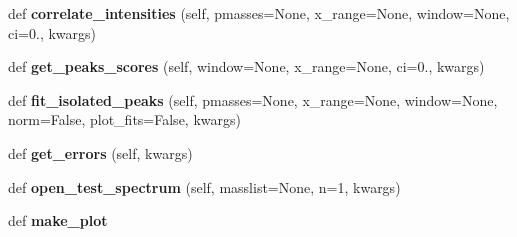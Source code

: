 \begin{DoxyCompactItemize}
\item 
\hypertarget{class_uni_dec_1_1unidec_1_1_uni_dec_a2db533d7a383e2bd7a8d031a2865cc4a}{}def {\bfseries correlate\+\_\+intensities} (self, pmasses=None, x\+\_\+range=None, window=None, ci=0., kwargs)\label{class_uni_dec_1_1unidec_1_1_uni_dec_a2db533d7a383e2bd7a8d031a2865cc4a}

\item 
\hypertarget{class_uni_dec_1_1unidec_1_1_uni_dec_af1f98ae0b18ea9be2fbec16be86ce940}{}def {\bfseries get\+\_\+peaks\+\_\+scores} (self, window=None, x\+\_\+range=None, ci=0., kwargs)\label{class_uni_dec_1_1unidec_1_1_uni_dec_af1f98ae0b18ea9be2fbec16be86ce940}

\item 
\hypertarget{class_uni_dec_1_1unidec_1_1_uni_dec_a99520cdc15ff2620cbf0f85e6c1c2a5c}{}def {\bfseries fit\+\_\+isolated\+\_\+peaks} (self, pmasses=None, x\+\_\+range=None, window=None, norm=False, plot\+\_\+fits=False, kwargs)\label{class_uni_dec_1_1unidec_1_1_uni_dec_a99520cdc15ff2620cbf0f85e6c1c2a5c}

\item 
\hypertarget{class_uni_dec_1_1unidec_1_1_uni_dec_a4cd16745c635c9617d5daeac315e2ba9}{}def {\bfseries get\+\_\+errors} (self, kwargs)\label{class_uni_dec_1_1unidec_1_1_uni_dec_a4cd16745c635c9617d5daeac315e2ba9}

\item 
\hypertarget{class_uni_dec_1_1unidec_1_1_uni_dec_a9bb988c8b235ee4b85be2105e0471f58}{}def {\bfseries open\+\_\+test\+\_\+spectrum} (self, masslist=None, n=1, kwargs)\label{class_uni_dec_1_1unidec_1_1_uni_dec_a9bb988c8b235ee4b85be2105e0471f58}

\item 
\hypertarget{class_uni_dec_1_1unidec_1_1_uni_dec_a45a7b5804f2e99148ba0971c3994afcb}{}def {\bfseries make\+\_\+plot}\label{class_uni_dec_1_1unidec_1_1_uni_dec_a45a7b5804f2e99148ba0971c3994afcb}

\end{DoxyCompactItemize}
